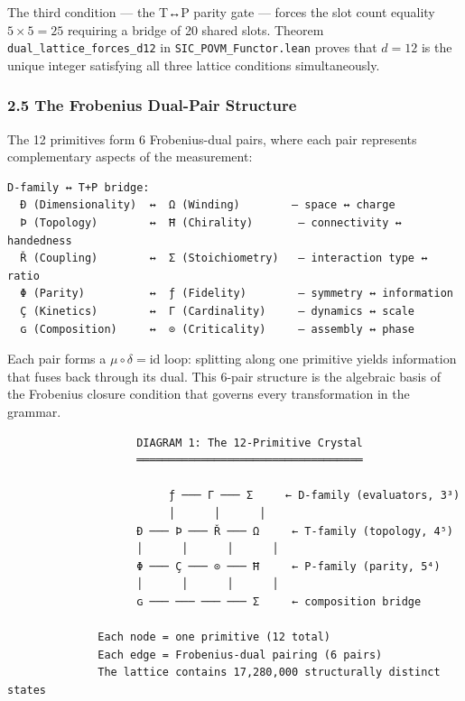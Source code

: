 The third condition --- the T↔P parity gate --- forces the slot count
equality \(5 \times 5 = 25\) requiring a bridge of 20 shared slots.
Theorem \texttt{dual\_lattice\_forces\_d12} in
\texttt{SIC\_POVM\_Functor.lean} proves that \(d=12\) is the unique
integer satisfying all three lattice conditions simultaneously.

\hypertarget{the-frobenius-dual-pair-structure}{%
\subsubsection{2.5 The Frobenius Dual-Pair
Structure}\label{the-frobenius-dual-pair-structure}}

The 12 primitives form 6 Frobenius-dual pairs, where each pair
represents complementary aspects of the measurement:

\begin{verbatim}
D-family ↔ T+P bridge:
  Ð (Dimensionality)  ↔  Ω (Winding)        — space ↔ charge
  Þ (Topology)        ↔  Ħ (Chirality)       — connectivity ↔ handedness
  Ř (Coupling)        ↔  Σ (Stoichiometry)   — interaction type ↔ ratio
  Φ (Parity)          ↔  ƒ (Fidelity)        — symmetry ↔ information
  Ç (Kinetics)        ↔  Γ (Cardinality)     — dynamics ↔ scale
  ɢ (Composition)     ↔  ⊙ (Criticality)     — assembly ↔ phase
\end{verbatim}

Each pair forms a \(\mu \circ \delta = \text{id}\) loop: splitting along
one primitive yields information that fuses back through its dual. This
6-pair structure is the algebraic basis of the Frobenius closure
condition that governs every transformation in the grammar.

\begin{verbatim}
                    DIAGRAM 1: The 12-Primitive Crystal
                    ═══════════════════════════════════

                         ƒ ─── Γ ─── Σ     ← D-family (evaluators, 3³)
                         │      │      │
                    Ð ─── Þ ─── Ř ─── Ω     ← T-family (topology, 4⁵)
                    │      │      │      │
                    Φ ─── Ç ─── ⊙ ─── Ħ     ← P-family (parity, 5⁴)
                    │      │      │      │
                    ɢ ─── ─── ─── ─── Σ     ← composition bridge

              Each node = one primitive (12 total)
              Each edge = Frobenius-dual pairing (6 pairs)
              The lattice contains 17,280,000 structurally distinct states
\end{verbatim}

